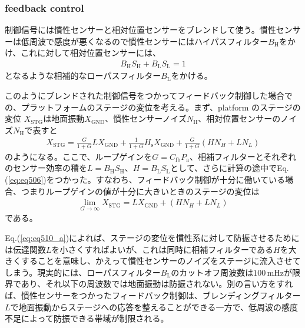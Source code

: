 \subsubsection{feedback control}
制御信号には慣性センサーと相対位置センサーをブレンドして使う。慣性センサーは低周波で感度が悪くなるので慣性センサーにはハイパスフィルター$B_{\mathrm{H}}$をかけ、これに対して相対位置センサーには、
\begin{eqnarray}
  B_{\mathrm{H}}S_{\mathrm{H}} + B_{\mathrm{L}}S_{\mathrm{L}} = 1   \label{eq:eq506}
\end{eqnarray}
となるような相補的なローパスフィルター$B_{\mathrm{L}}$をかける。

このようにブレンドされた制御信号をつかってフィードバック制御した場合での、プラットフォームのステージの変位を考える。まず、platform のステージの変位 $X_{\mathrm{STG}}$は地面振動$X_{\mathrm{GND}}$、慣性センサーノイズ$N_{\mathrm{H}}$、相対位置センサーのノイズ$N_{\mathrm{H}}$で表すと
\begin{eqnarray}
  \label{eq:eq510}
  X_{\mathrm{STG}} = \frac{G}{1+G}LX_{\mathrm{GND}} + \frac{1}{1+G}H_{\mathrm{s}}X_{\mathrm{GND}} + \frac{G}{1+G}\left(HN_{H}+LN_{L}\right)
\end{eqnarray}
のようになる。ここで、ループゲインを$G=C_{\mathrm{fb}}P_{\mathrm{a}}$、相補フィルターとそれぞれのセンサー効率の積を$L=B_{\mathrm{H}}S_{\mathrm{H}}$、$H=B_{\mathrm{L}}S_{\mathrm{L}}$として、さらに計算の途中でEq.(\ref{eq:eq506})をつかった。すなわち、フィードバック制御が十分に働いている場合、つまりループゲインの値が十分に大きいときのステージの変位は
\begin{eqnarray}
  \lim_{G\to\infty} X_{\mathrm{STG}} = LX_{\mathrm{GND}} + \left(HN_{H}+LN_{L}\right) \label{eq:eq510_a}
\end{eqnarray}
である。

Eq.(\ref{eq:eq510_a})によれば、ステージの変位を慣性系に対して防振させるためには伝達関数$L$を小さくすればよいが、これは同時に相補フィルターである$H$を大きくすることを意味し、かえって慣性センサーのノイズをステージに流入させてしまう。現実的には、ローパスフィルター$B_{\mathrm{L}}$のカットオフ周波数は$100\,\mathrm{mHz}$が限界であり、それ以下の周波数では地面振動は防振されない。別の言い方をすれば、慣性センサーをつかったフィードバック制御は、ブレンディングフィルター$L$で地面振動からステージへの応答を整えることができる一方で、低周波の感度不足によって防振できる帯域が制限される。



